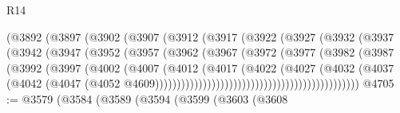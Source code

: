 \begin{lexlean}{R14}
\begin{coremodule}
                                (@3892
                                  (@3897
                                    (@3902
                                      (@3907
                                        (@3912
                                          (@3917
                                            (@3922
                                              (@3927
                                                (@3932
                                                  (@3937
                                                    (@3942
                                                      (@3947
                                                        (@3952
                                                          (@3957
                                                            (@3962
                                                              (@3967
                                                                (@3972
                                                                  (@3977
                                                                    (@3982
                                                                      (@3987
                                                                        (@3992
                                                                          (@3997
                                                                            (@4002
                                                                              (@4007
                                                                                (@4012
                                                                                  (@4017
                                                                                    (@4022
                                                                                      (@4027
                                                                                        (@4032
                                                                                          (@4037
                                                                                            (@4042
                                                                                              (@4047
                                                                                                (@4052
                                                                                                  @4609)))))))))))))))))))))))))))))))))))))))))))))))
@4705 := @3579
    (@3584
      (@3589
        (@3594
          (@3599
            (@3603
              (@3608

\end{coremodule}
\end{lexlean}
